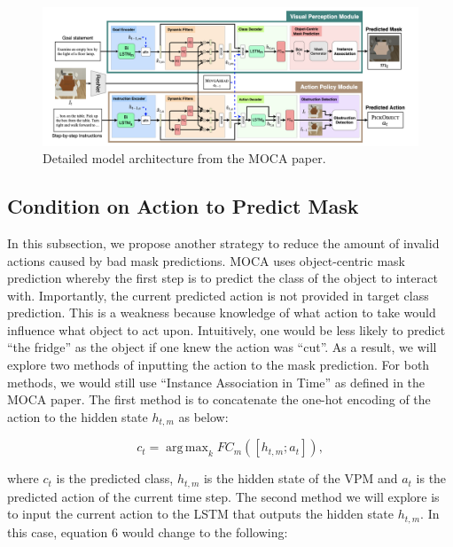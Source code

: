 \documentclass[11pt,a4paper]{article}
\DeclareMathOperator*{\argmax}{arg\,max}
\begin{document}
\begin{figure}
    \centering
    \includegraphics[width=\linewidth]{Reports/5-Proposed-Approach/system_arch.png}
    \caption{Detailed model architecture from the MOCA paper.}
    \label{fig:sys_arch}
\end{figure}


\subsection{Condition on Action to Predict Mask}

In this subsection, we propose another strategy to reduce the amount of invalid actions caused by bad mask predictions. MOCA uses object-centric mask prediction whereby the first step is to predict the class of the object to interact with. Importantly, the current predicted action is not provided in target class prediction. This is a weakness because knowledge of what action to take would influence what object to act upon. Intuitively, one would be less likely to predict ``the fridge'' as the object if one knew the action was ``cut''. As a result, we will explore two methods of inputting the action to the mask prediction. For both methods, we would still use ``Instance Association in Time'' as defined in the MOCA paper. The first method is to concatenate the one-hot encoding of the action to the hidden state $h_{t,m}$ as below:

\begin{equation}
    c_t = \argmax_{k} FC_{m}([h_{t,m}; a_{t}]),

\end{equation}

where $c_t$ is the predicted class, $h_{t,m}$ is the hidden state of the VPM and $a_t$ is the predicted action of the current time step. The second method we will explore is to input the current action to the LSTM that outputs the hidden state $h_{t,m}$. In this case, equation 6 would change to the following: 
\end{document}
